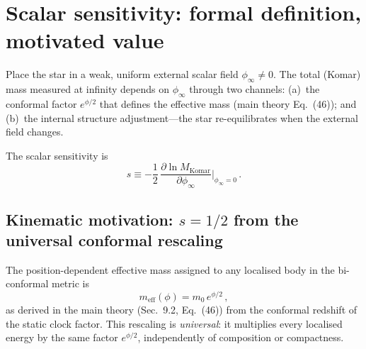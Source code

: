 \documentclass[11pt]{article}
\begin{document}
\section{Scalar sensitivity: formal definition, motivated value}
\label{sec:s_def}

Place the star in a weak, uniform external scalar field
$\phi_\infty \neq 0$.  The total (Komar) mass measured at
infinity depends on $\phi_\infty$ through two channels:
(a)~the conformal factor $e^{\phi/2}$ that defines the
effective mass (main theory Eq.~(46)); and (b)~the internal
structure adjustment---the star re-equilibrates when the
external field changes.

The scalar sensitivity is
\begin{equation}\label{eq:s_formal}
  \boxed{s \equiv -\frac{1}{2}\,
  \frac{\partial\ln M_{\mathrm{Komar}}}
       {\partial\phi_\infty}
  \bigg|_{\phi_\infty = 0}\,.}
\end{equation}

\subsection{Kinematic motivation: $s = 1/2$ from the
universal conformal rescaling}
\label{sec:s_kinematic}

The position-dependent effective mass assigned to any
localised body in the bi-conformal metric is
\begin{equation}\label{eq:meff_app16}
  m_{\mathrm{eff}}(\phi) = m_0\,e^{\phi/2}\,,
\end{equation}
as derived in the main theory (Sec.~9.2, Eq.~(46)) from
the conformal redshift of the static clock factor.  This
rescaling is \emph{universal}: it multiplies every
localised energy by the same factor $e^{\phi/2}$,
independently of composition or compactness.
\end{document}
